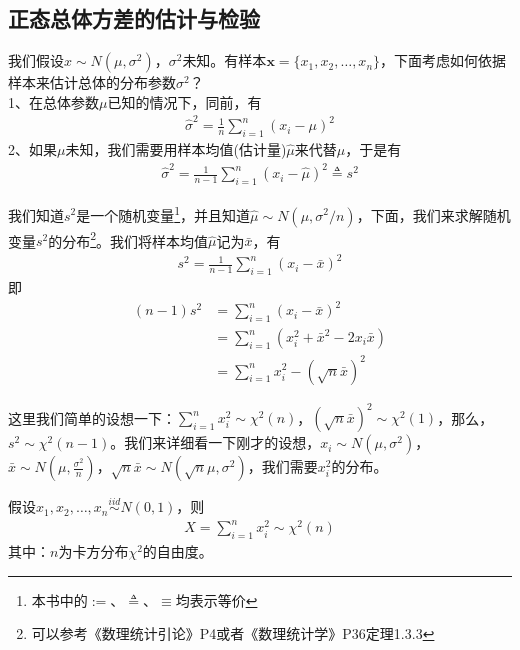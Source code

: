     \subsection{正态总体方差的估计与检验}
        \par
        我们假设$x\sim N(\mu,\sigma^2)$，$\sigma^2$未知。有样本$\mathbf{x}= \{x_1,x_2,\dots,x_n\}$，下面考虑如何依据样本来估计总体的分布参数$\sigma^2$？\\
        1、在总体参数$\mu$已知的情况下，同前，有
        \begin{align*}
        \hat{\sigma}^2 = \frac{1}{n} \sum_{i = 1}^n(x_i -\mu)^2
        \end{align*}
        2、如果$\mu$未知，我们需要用样本均值(估计量)$\hat{\mu}$来代替$\mu$，于是有
        \begin{align*}
        \hat{\sigma}^2 = \frac{1}{n-1}\sum_{i=1}^n(x_i - \hat{\mu})^2\triangleq s^2
        \end{align*}
        \par
        我们知道$s^2$是一个随机变量\footnote{本书中的$:=$、$\triangleq $、$\equiv$均表示等价}，并且知道$\hat{\mu} \sim N(\mu,\sigma^2/n)$，下面，我们来求解随机变量$s^2$的分布\footnote{可以参考《数理统计引论》P4或者《数理统计学》P36定理1.3.3}。我们将样本均值$\hat{\mu}$记为$\bar{x}$，有
        \begin{align*}
        s^2 = \frac{1}{n-1}\sum_{i=1}^n(x_i - \bar{x})^2
        \end{align*}
        即
        \begin{align*}
        (n-1)s^2 &= \sum_{i=1}^n(x_i - \bar{x})^2\\
        &=\sum_{i=1}^n (x_i^2 + \bar{x}^2 -2x_i\bar{x})\\
        &=\sum_{i = 1}^n x_i^2 - (\sqrt{n}\bar{x})^2
        \end{align*}
        \par
        这里我们简单的设想一下：$\sum_{i =1 }^n x_i^2 \sim \chi^2(n)$，$(\sqrt{n}\bar{x})^2\sim \chi^2(1)$，那么，$s^2 \sim \chi^2(n-1)$。我们来详细看一下刚才的设想，$x_i \sim N(\mu,\sigma^2)$，$\bar{x}\sim N(\mu,\frac{\sigma^2}{n})$，$\sqrt{n}\bar{x}\sim N(\sqrt{n}\mu,\sigma^2)$，我们需要$x_i^2$的分布。
        \begin{lemma}[卡方分布]
        假设$x_1,x_2,\dots,x_n\overset{iid}{\sim} N(0,1)$，则
        \begin{align*}
        X = \sum_{i=1}^n x_i^2 \sim \chi^2 (n)
        \end{align*}
        其中：$n$为卡方分布$\chi^2$的自由度。
        \end{lemma}
